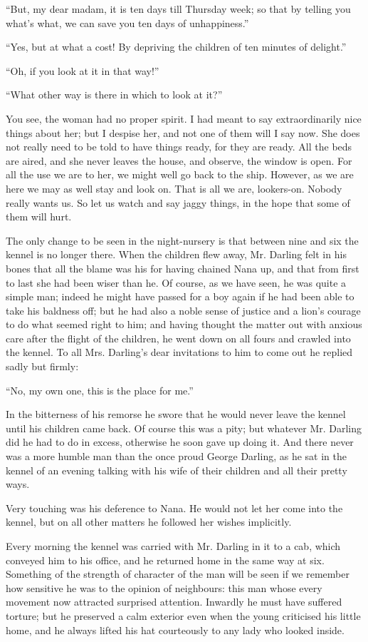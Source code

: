 ``But, my dear madam, it is ten days till Thursday week; so that by
telling you what's what, we can save you ten days of unhappiness.''

``Yes, but at what a cost! By depriving the children of ten minutes of
delight.''

``Oh, if you look at it in that way!''

``What other way is there in which to look at it?''

You see, the woman had no proper spirit. I had meant to say
extraordinarily nice things about her; but I despise her, and not one
of them will I say now. She does not really need to be told to have
things ready, for they are ready. All the beds are aired, and she never
leaves the house, and observe, the window is open. For all the use we
are to her, we might well go back to the ship. However, as we are here
we may as well stay and look on. That is all we are, lookers-on. Nobody
really wants us. So let us watch and say jaggy things, in the hope that
some of them will hurt.

The only change to be seen in the night-nursery is that between nine
and six the kennel is no longer there. When the children flew away, Mr.
Darling felt in his bones that all the blame was his for having chained
Nana up, and that from first to last she had been wiser than he. Of
course, as we have seen, he was quite a simple man; indeed he might
have passed for a boy again if he had been able to take his baldness
off; but he had also a noble sense of justice and a lion's courage to
do what seemed right to him; and having thought the matter out with
anxious care after the flight of the children, he went down on all
fours and crawled into the kennel. To all Mrs. Darling's dear
invitations to him to come out he replied sadly but firmly:

``No, my own one, this is the place for me.''

In the bitterness of his remorse he swore that he would never leave the
kennel until his children came back. Of course this was a pity; but
whatever Mr. Darling did he had to do in excess, otherwise he soon gave
up doing it. And there never was a more humble man than the once proud
George Darling, as he sat in the kennel of an evening talking with his
wife of their children and all their pretty ways.

Very touching was his deference to Nana. He would not let her come into
the kennel, but on all other matters he followed her wishes implicitly.

Every morning the kennel was carried with Mr. Darling in it to a cab,
which conveyed him to his office, and he returned home in the same way
at six. Something of the strength of character of the man will be seen
if we remember how sensitive he was to the opinion of neighbours: this
man whose every movement now attracted surprised attention. Inwardly he
must have suffered torture; but he preserved a calm exterior even when
the young criticised his little home, and he always lifted his hat
courteously to any lady who looked inside.

